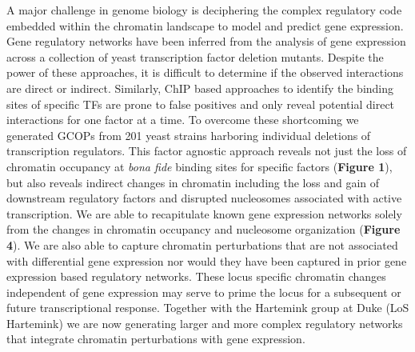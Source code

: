%
A major challenge in genome biology is deciphering the complex regulatory code embedded within the chromatin landscape to model and predict gene expression. 
Gene regulatory networks have been inferred  from the analysis of gene expression across a collection of yeast transcription factor deletion mutants\citep{Hu2007-fs,Kemmeren2014-el}.  Despite the power of these approaches, it is difficult to determine if the observed interactions are direct or indirect. Similarly, ChIP based approaches to identify the binding sites of specific TFs are prone to false positives\citep{Teytelman2013-id} and only reveal potential direct interactions for one factor at a time.  To overcome these shortcoming we generated GCOPs from 201 yeast strains harboring individual deletions of transcription regulators.  This factor agnostic approach reveals not just the loss of chromatin occupancy at \emph{bona fide} binding sites for specific factors ({\color{dukeblue}\textbf{Figure 1}}), but also reveals indirect changes in chromatin including the loss and gain of downstream regulatory factors and disrupted nucleosomes associated with active transcription.  We are able to recapitulate known gene expression networks solely from the changes in chromatin occupancy and nucleosome organization ({\color{dukeblue}\textbf{Figure 4}}).  We are also able to capture chromatin perturbations that are not associated with differential gene expression nor would they have been captured in prior gene expression based regulatory networks.  These locus specific chromatin changes independent of gene expression may serve to prime the locus for a subsequent or future transcriptional response\citep{altman}. Together with the Hartemink group at Duke (LoS Hartemink) we are now generating larger and more complex regulatory networks that integrate chromatin perturbations with gene expression.    


